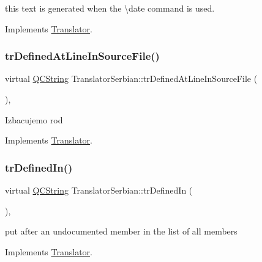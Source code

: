 this text is generated when the \textbackslash{}date command is used. 

Implements \mbox{\hyperlink{class_translator}{Translator}}.

\mbox{\label{class_translator_serbian_a7204c64240f119b344f318f850828b67}} 
\subsubsection{\texorpdfstring{trDefinedAtLineInSourceFile()}{trDefinedAtLineInSourceFile()}}
{\footnotesize\ttfamily virtual \mbox{\hyperlink{class_q_c_string}{Q\+C\+String}} Translator\+Serbian\+::tr\+Defined\+At\+Line\+In\+Source\+File (\begin{DoxyParamCaption}{ }\end{DoxyParamCaption})\hspace{0.3cm}{\ttfamily [inline]}, {\ttfamily [virtual]}}

Izbacujemo rod

Implements \mbox{\hyperlink{class_translator}{Translator}}.

\mbox{\label{class_translator_serbian_a5ad78a097ea4368f2c5fda0c2d939947}} 
\subsubsection{\texorpdfstring{trDefinedIn()}{trDefinedIn()}}
{\footnotesize\ttfamily virtual \mbox{\hyperlink{class_q_c_string}{Q\+C\+String}} Translator\+Serbian\+::tr\+Defined\+In (\begin{DoxyParamCaption}{ }\end{DoxyParamCaption})\hspace{0.3cm}{\ttfamily [inline]}, {\ttfamily [virtual]}}

put after an undocumented member in the list of all members 

Implements \mbox{\hyperlink{class_translator}{Translator}}.

\mbox{\label{class_translator_serbian_a5a1c1cab525d4d6e201feec2afd25a75}} 
